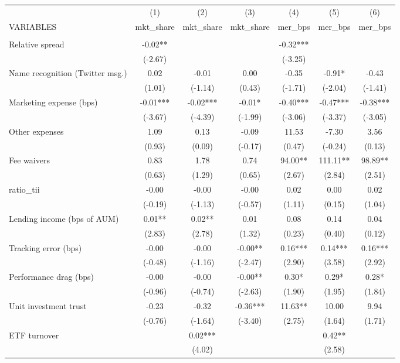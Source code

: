 \documentclass[]{article}
\begin{document}
\begin{tabular}{lcccccc} \hline
 & (1) & (2) & (3) & (4) & (5) & (6) \\
VARIABLES & mkt\_share & mkt\_share & mkt\_share & mer\_bps & mer\_bps & mer\_bps \\ \hline
 &  &  &  &  &  &  \\
Relative spread & -0.02** &  &  & -0.32*** &  &  \\
 & (-2.67) &  &  & (-3.25) &  &  \\
Name recognition (Twitter msg.) & 0.02 & -0.01 & 0.00 & -0.35 & -0.91* & -0.43 \\
 & (1.01) & (-1.14) & (0.43) & (-1.71) & (-2.04) & (-1.41) \\
Marketing expense (bps) & -0.01*** & -0.02*** & -0.01* & -0.40*** & -0.47*** & -0.38*** \\
 & (-3.67) & (-4.39) & (-1.99) & (-3.06) & (-3.37) & (-3.05) \\
Other expenses & 1.09 & 0.13 & -0.09 & 11.53 & -7.30 & 3.56 \\
 & (0.93) & (0.09) & (-0.17) & (0.47) & (-0.24) & (0.13) \\
Fee waivers & 0.83 & 1.78 & 0.74 & 94.00** & 111.11** & 98.89** \\
 & (0.63) & (1.29) & (0.65) & (2.67) & (2.84) & (2.51) \\
ratio\_tii & -0.00 & -0.00 & -0.00 & 0.02 & 0.00 & 0.02 \\
 & (-0.19) & (-1.13) & (-0.57) & (1.11) & (0.15) & (1.04) \\
Lending income (bps of AUM) & 0.01** & 0.02** & 0.01 & 0.08 & 0.14 & 0.04 \\
 & (2.83) & (2.78) & (1.32) & (0.23) & (0.40) & (0.12) \\
Tracking error (bps) & -0.00 & -0.00 & -0.00** & 0.16*** & 0.14*** & 0.16*** \\
 & (-0.48) & (-1.16) & (-2.47) & (2.90) & (3.58) & (2.92) \\
Performance drag (bps) & -0.00 & -0.00 & -0.00** & 0.30* & 0.29* & 0.28* \\
 & (-0.96) & (-0.74) & (-2.63) & (1.90) & (1.95) & (1.84) \\
Unit investment trust & -0.23 & -0.32 & -0.36*** & 11.63** & 10.00 & 9.94 \\
 & (-0.76) & (-1.64) & (-3.40) & (2.75) & (1.64) & (1.71) \\
ETF turnover &  & 0.02*** &  &  & 0.42** &  \\
 &  & (4.02) &  &  & (2.58) &  \\

\end{tabular}
\end{document}
